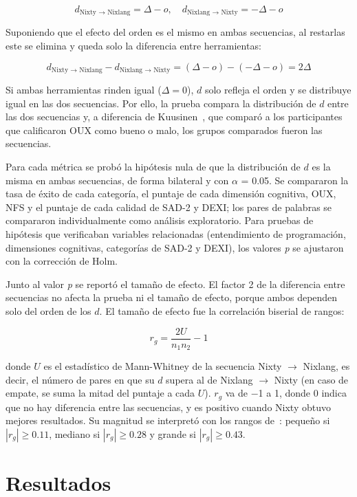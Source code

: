 \[ d_{\text{Nixty $\rightarrow$ Nixlang}} = \Delta - o, \quad d_{\text{Nixlang $\rightarrow$ Nixty}} = -\Delta - o \]

Suponiendo que el efecto del orden es el mismo en ambas secuencias, al restarlas este se elimina y queda solo la diferencia entre herramientas:

\[ d_{\text{Nixty $\rightarrow$ Nixlang}} - d_{\text{Nixlang $\rightarrow$ Nixty}} = (\Delta - o) - (-\Delta - o) = 2 \Delta \]

Si ambas herramientas rinden igual ($\Delta = 0$), $d$ solo refleja el orden y se distribuye igual en las dos secuencias. Por ello, la prueba compara la distribución de $d$ entre las dos secuencias y, a diferencia de Kuusinen~\cite{Kuusinen2016}, que comparó a los participantes que calificaron OUX como bueno o malo, los grupos comparados fueron las secuencias.

Para cada métrica se probó la hipótesis nula de que la distribución de $d$ es la misma en ambas secuencias, de forma bilateral y con $\alpha$ = 0.05. Se compararon la tasa de éxito de cada categoría, el puntaje de cada dimensión cognitiva, OUX, NFS y el puntaje de cada calidad de SAD-2 y DEXI; los pares de palabras se compararon individualmente como análisis exploratorio. Para pruebas de hipótesis que verificaban variables relacionadas (entendimiento de programación, dimensiones cognitivas, categorías de SAD-2 y DEXI), los valores \emph{p} se ajustaron con la corrección de Holm.

Junto al valor \emph{p} se reportó el tamaño de efecto. El factor 2 de la diferencia entre secuencias no afecta la prueba ni el tamaño de efecto, porque ambos dependen solo del orden de los $d$. El tamaño de efecto fue la correlación biserial de rangos:

\[ r_g = \frac{2U}{n_1 n_2} - 1 \]

donde $U$ es el estadístico de Mann-Whitney de la secuencia Nixty $\rightarrow$ Nixlang, es decir, el número de pares en que su $d$ supera al de Nixlang $\rightarrow$ Nixty (en caso de empate, se suma la mitad del puntaje a cada $U$). $r_g$ va de $-$1 a 1, donde 0 indica que no hay diferencia entre las secuencias, y es positivo cuando Nixty obtuvo mejores resultados. Su magnitud se interpretó con los rangos de~\cite{fielperesEffectSizesNonparametric}: pequeño si $|r_g| \geq 0.11$, mediano si $|r_g| \geq 0.28$ y grande si $|r_g| \geq 0.43$.

\chapter{Resultados}

